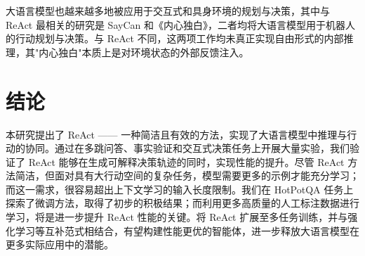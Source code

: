 大语言模型也越来越多地被应用于交互式和具身环境的规划与决策，其中与 ReAct 最相关的研究是 SayCan 和《内心独白》，二者均将大语言模型用于机器人的行动规划与决策。与 ReAct 不同，这两项工作均未真正实现自由形式的内部推理，其"内心独白"本质上是对环境状态的外部反馈注入。

\section{结论}

本研究提出了 ReAct —— 一种简洁且有效的方法，实现了大语言模型中推理与行动的协同。通过在多跳问答、事实验证和交互式决策任务上开展大量实验，我们验证了 ReAct 能够在生成可解释决策轨迹的同时，实现性能的提升。尽管 ReAct 方法简洁，但面对具有大行动空间的复杂任务，模型需要更多的示例才能充分学习；而这一需求，很容易超出上下文学习的输入长度限制。我们在 HotPotQA 任务上探索了微调方法，取得了初步的积极结果；而利用更多高质量的人工标注数据进行学习，将是进一步提升 ReAct 性能的关键。将 ReAct 扩展至多任务训练，并与强化学习等互补范式相结合，有望构建性能更优的智能体，进一步释放大语言模型在更多实际应用中的潜能。

\begingroup
    \printbibliography[title={外文翻译参考文献}]
\endgroup
